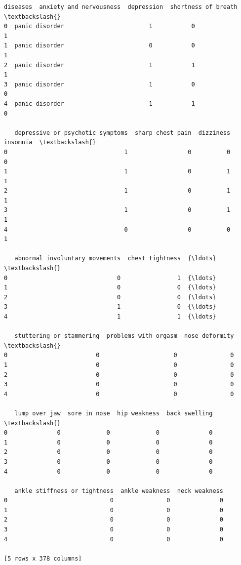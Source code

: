 \documentclass[11pt]{article}
\begin{document}
    
    \begin{Verbatim}[commandchars=\\\{\}]
         diseases  anxiety and nervousness  depression  shortness of breath  \textbackslash{}
0  panic disorder                        1           0                    1   
1  panic disorder                        0           0                    1   
2  panic disorder                        1           1                    1   
3  panic disorder                        1           0                    0   
4  panic disorder                        1           1                    0   

   depressive or psychotic symptoms  sharp chest pain  dizziness  insomnia  \textbackslash{}
0                                 1                 0          0         0   
1                                 1                 0          1         1   
2                                 1                 0          1         1   
3                                 1                 0          1         1   
4                                 0                 0          0         1   

   abnormal involuntary movements  chest tightness  {\ldots}  \textbackslash{}
0                               0                1  {\ldots}   
1                               0                0  {\ldots}   
2                               0                0  {\ldots}   
3                               1                0  {\ldots}   
4                               1                1  {\ldots}   

   stuttering or stammering  problems with orgasm  nose deformity  \textbackslash{}
0                         0                     0               0   
1                         0                     0               0   
2                         0                     0               0   
3                         0                     0               0   
4                         0                     0               0   

   lump over jaw  sore in nose  hip weakness  back swelling  \textbackslash{}
0              0             0             0              0   
1              0             0             0              0   
2              0             0             0              0   
3              0             0             0              0   
4              0             0             0              0   

   ankle stiffness or tightness  ankle weakness  neck weakness  
0                             0               0              0  
1                             0               0              0  
2                             0               0              0  
3                             0               0              0  
4                             0               0              0  

[5 rows x 378 columns]
    \end{Verbatim}
\end{document}
